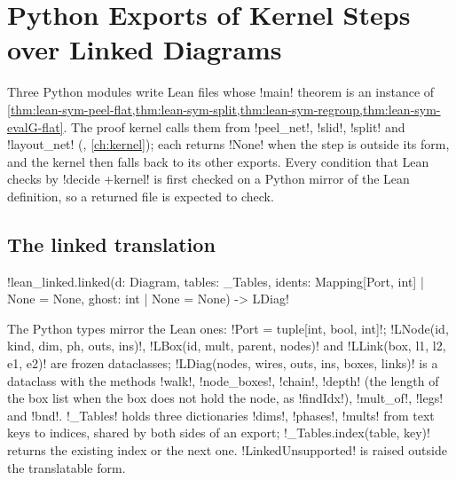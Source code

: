 \section{Python Exports of Kernel Steps over Linked Diagrams}\label{sec:lean-sym-py-linked}

Three Python modules write Lean files whose \lean!main! theorem is an instance of \cref{thm:lean-sym-peel-flat,thm:lean-sym-split,thm:lean-sym-regroup,thm:lean-sym-evalG-flat}. The proof kernel calls them from \py!peel_net!, \py!slid!, \py!split! and \py!layout_net! (, \cref{ch:kernel}); each returns \py!None! when the step is outside its form, and the kernel then falls back to its other exports. Every condition that Lean checks by \lean!decide +kernel! is first checked on a Python mirror of the Lean definition, so a returned file is expected to check.

\subsection{The linked translation}

\begin{signature}
\py!lean_linked.linked(d: Diagram, tables: _Tables, idents: Mapping[Port, int] | None = None, ghost: int | None = None) -> LDiag!
\end{signature}

The Python types mirror the Lean ones: \py!Port = tuple[int, bool, int]!; \py!LNode(id, kind, dim, ph, outs, ins)!, \py!LBox(id, mult, parent, nodes)! and \py!LLink(box, l1, l2, e1, e2)! are frozen dataclasses; \py!LDiag(nodes, wires, outs, ins, boxes, links)! is a dataclass with the methods \py!walk!, \py!node_boxes!, \py!chain!, \py!depth! (the length of the box list when the box does not hold the node, as \lean!findIdx!), \py!mult_of!, \py!legs! and \py!bnd!. \py!_Tables! holds three dictionaries \py!dims!, \py!phases!, \py!mults! from text keys to indices, shared by both sides of an export; \py!_Tables.index(table, key)! returns the existing index or the next one. \py!LinkedUnsupported! is raised outside the translatable form.

